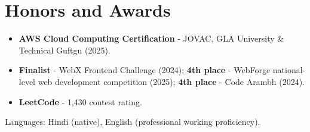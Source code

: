 \documentclass[11pt,a4paper,sans]{moderncv}
\begin{document}

\section{Honors and Awards}
\vspace{1pt}
\begin{itemize}
    \item {\textbf{AWS Cloud Computing Certification} - JOVAC, GLA University \& Technical Guftgu (2025).}
    \item {\textbf{Finalist} - WebX Frontend Challenge (2024); \textbf{4th place} - WebForge national-level web development competition (2025); \textbf{4th place} - Code Arambh (2024).}
    \item {\textbf{LeetCode} - 1,430 contest rating.}
\end{itemize}


\vspace{2pt}
\small{Languages: Hindi (native), English (professional working proficiency).}
\end{document}
